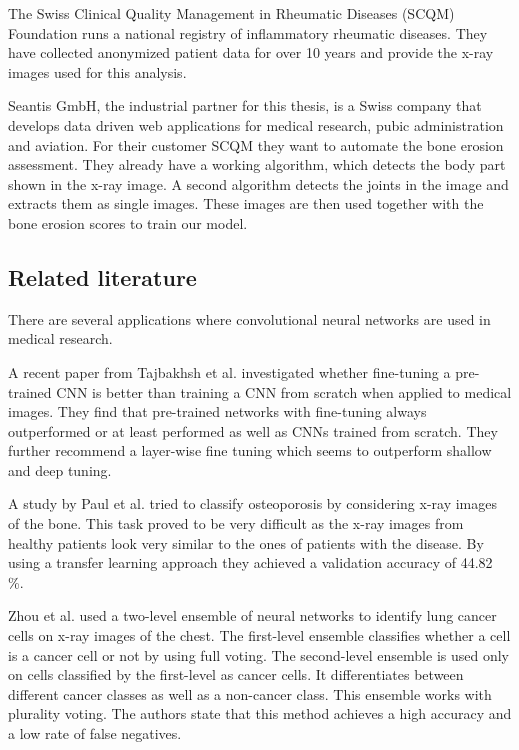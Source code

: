 \documentclass[12pt]{article}
\begin{document}
The Swiss Clinical Quality Management in Rheumatic Diseases (SCQM) Foundation runs a national registry of inflammatory rheumatic diseases. \cite{scqm_about} They have collected anonymized patient data for over 10 years and provide the x-ray images used for this analysis.

Seantis GmbH, the industrial partner for this thesis, is a Swiss company that develops data driven web applications for medical research, pubic administration and aviation. \cite{seantis_about} For their customer SCQM they want to automate the bone erosion assessment. They already have a working algorithm, which detects the body part shown in the x-ray image. A second algorithm detects the joints in the image and extracts them as single images. These images are then used together with the bone erosion scores to train our model.


\subsection{Related literature}


There are several applications where convolutional neural networks are used in medical research.

A recent paper from Tajbakhsh et al. \cite{tajbakhsh_2017} investigated whether fine-tuning a pre-trained CNN is better than training a CNN from scratch when applied to medical images. They find that pre-trained networks with fine-tuning always outperformed or at least performed as well as CNNs trained from scratch. They further recommend a layer-wise fine tuning which seems to outperform shallow and deep tuning.

A study by Paul et al. \cite{paul_2017} tried to classify osteoporosis by considering x-ray images of the bone. This task proved to be very difficult as the x-ray images from healthy patients look very similar to the ones of patients with the disease. By using a transfer learning approach they achieved a validation accuracy of 44.82 \%.

Zhou et al. \cite{zhou_2002} used a two-level ensemble of neural networks to identify lung cancer cells on x-ray images of the chest. The first-level ensemble classifies whether a cell is a cancer cell or not by using full voting. The second-level ensemble is used only on cells classified by the first-level as cancer cells. It differentiates between different cancer classes as well as a non-cancer class. This ensemble works with plurality voting. The authors state that this method achieves a high accuracy and a low rate of false negatives.
\end{document}
